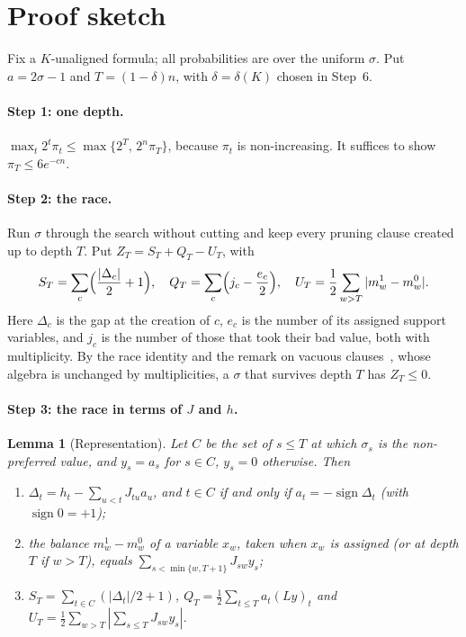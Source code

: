\documentclass[11pt,a4paper]{article}
\newtheorem{lemma}[theorem]{Lemma}
\theoremstyle{definition}
\theoremstyle{remark}
\begin{document}
\section{Proof sketch}\label{sec:proof}

Fix a $K$-unaligned formula; all probabilities are over the uniform $\sigma$.
Put $a=2\sigma-1$ and $T=(1-\delta)n$, with $\delta=\delta(K)$ chosen in
Step~6.

\paragraph{Step 1: one depth.} $\max_t2^t\pi_t\le\max\{2^T,\,2^n\pi_T\}$,
because $\pi_t$ is non-increasing. It suffices to show $\pi_T\le6e^{-cn}$.

\paragraph{Step 2: the race.} Run $\sigma$ through the search without cutting
and keep every pruning clause created up to depth $T$. Put
$Z_T=S_T+Q_T-U_T$, with
\[
 S_T=\sum_c\Bigl(\frac{|\Delta_c|}2+1\Bigr),\quad
 Q_T=\sum_c\Bigl(j_c-\frac{e_c}2\Bigr),\quad
 U_T=\frac12\sum_{w>T}|m^1_w-m^0_w| .
\]
Here $\Delta_c$ is the gap at the creation of $c$, $e_c$ is the number of its
assigned support variables, and $j_c$ is the number of those that took their
bad value, both with multiplicity. By the race identity and the remark on
vacuous clauses~\cite[Lemma~2, Remark~3]{N7}, whose algebra is unchanged by
multiplicities, a $\sigma$ that survives depth $T$ has $Z_T\le0$.

\paragraph{Step 3: the race in terms of $J$ and $h$.}
\begin{lemma}[Representation]\label{lem:rep}
Let $C$ be the set of $s\le T$ at which $\sigma_s$ is the non-preferred value,
and $y_s=a_s$ for $s\in C$, $y_s=0$ otherwise. Then
\begin{enumerate}
 \item[(a)] $\Delta_t=h_t-\sum_{u<t}J_{tu}a_u$, and $t\in C$ if and only if
 $a_t=-\operatorname{sign}\Delta_t$ (with $\operatorname{sign}0=+1$);
 \item[(b)] the balance $m^1_w-m^0_w$ of a variable $x_w$, taken when $x_w$ is
 assigned (or at depth $T$ if $w>T$), equals $\sum_{s<\min\{w,T+1\}}J_{sw}y_s$;
 \item[(c)] $S_T=\sum_{t\in C}(|\Delta_t|/2+1)$,
 $Q_T=\frac12\sum_{t\le T}a_t(Ly)_t$ and
 $U_T=\frac12\sum_{w>T}|\sum_{s\le T}J_{sw}y_s|$.
\end{enumerate}
\end{lemma}
\end{document}
